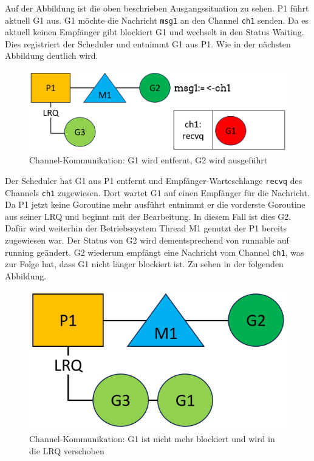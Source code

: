 \documentclass[fontsize=12pt,paper=a4,twoside=semi,parskip=half-,headsepline,headinclude]{scrreprt}
\begin{document}
Auf der Abbildung ist die oben beschrieben Ausgangssituation zu sehen. P1 führt aktuell G1 aus. G1 möchte die Nachricht \texttt{msg1} an den Channel \texttt{ch1} senden. Da es aktuell keinen Empfänger gibt blockiert G1 und wechselt in den Status Waiting. Dies registriert der Scheduler und entnimmt G1 aus P1. Wie in der nächsten Abbildung deutlich wird.

\begin{figure}[h]
	\centering
	\includegraphics[scale=0.5]{figures/GoroutineChannel2.png}
	\caption{Channel-Kommunikation: G1 wird entfernt, G2 wird ausgeführt}
	\label{fig:GoroutineChannel2}
\end{figure}

Der Scheduler hat G1 aus P1 entfernt und Empfänger-Warteschlange \texttt{recvq} des Channels \texttt{ch1} zugewiesen. Dort wartet G1 auf einen Empfänger für die Nachricht. Da P1 jetzt keine Goroutine mehr ausführt entnimmt er die vorderste Goroutine aus seiner LRQ und beginnt mit der Bearbeitung. In diesem Fall ist dies G2. Dafür wird weiterhin der Betriebssystem Thread M1 genutzt der P1 bereits zugewiesen war. Der Status von G2 wird dementsprechend von runnable auf running geändert. G2 wiederum empfängt eine Nachricht vom Channel \texttt{ch1}, was zur Folge hat, dass G1 nicht länger blockiert ist. Zu sehen in der folgenden Abbildung.

\begin{figure}[h]
	\centering
	\includegraphics[scale=0.5]{figures/GoroutineChannel3.png}
	\caption{Channel-Kommunikation: G1 ist nicht mehr blockiert und wird in die LRQ verschoben}
	\label{fig:GoroutineChannel3}
\end{figure}
\end{document}
